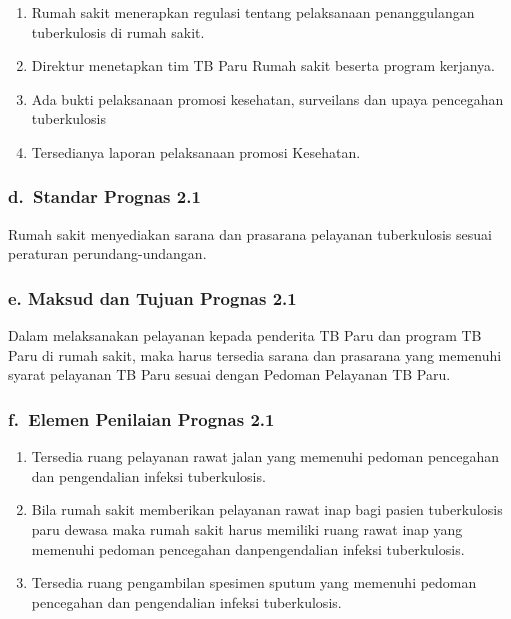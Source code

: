\documentclass[
]{book}
\providecommand{\tightlist}{%
  \setlength{\itemsep}{0pt}\setlength{\parskip}{0pt}}
\begin{document}
\begin{enumerate}
\def\labelenumi{\arabic{enumi}.}
\tightlist
\item
  Rumah sakit menerapkan regulasi tentang pelaksanaan penanggulangan tuberkulosis di rumah sakit.
\item
  Direktur menetapkan tim TB Paru Rumah sakit beserta program kerjanya.
\item
  Ada bukti pelaksanaan promosi kesehatan, surveilans dan upaya pencegahan tuberkulosis
\item
  Tersedianya laporan pelaksanaan promosi Kesehatan.
\end{enumerate}

\hypertarget{d.-standar-prognas-2.1}{%
\subsubsection*{d.~Standar Prognas 2.1}\label{d.-standar-prognas-2.1}}

Rumah sakit menyediakan sarana dan prasarana pelayanan tuberkulosis sesuai peraturan perundang-undangan.

\hypertarget{e.-maksud-dan-tujuan-prognas-2.1}{%
\subsubsection*{e. Maksud dan Tujuan Prognas 2.1}\label{e.-maksud-dan-tujuan-prognas-2.1}}

Dalam melaksanakan pelayanan kepada penderita TB Paru dan program TB Paru di rumah sakit, maka harus tersedia sarana dan prasarana yang memenuhi syarat pelayanan TB Paru sesuai dengan Pedoman Pelayanan TB Paru.

\hypertarget{f.-elemen-penilaian-prognas-2.1}{%
\subsubsection*{f.~Elemen Penilaian Prognas 2.1}\label{f.-elemen-penilaian-prognas-2.1}}

\begin{enumerate}
\def\labelenumi{\arabic{enumi}.}
\tightlist
\item
  Tersedia ruang pelayanan rawat jalan yang memenuhi pedoman pencegahan dan pengendalian infeksi tuberkulosis.
\item
  Bila rumah sakit memberikan pelayanan rawat inap bagi pasien tuberkulosis paru dewasa maka rumah sakit harus memiliki ruang rawat inap yang memenuhi pedoman pencegahan danpengendalian infeksi tuberkulosis.
\item
  Tersedia ruang pengambilan spesimen sputum yang memenuhi pedoman pencegahan dan pengendalian infeksi tuberkulosis.
\end{enumerate}
\end{document}
